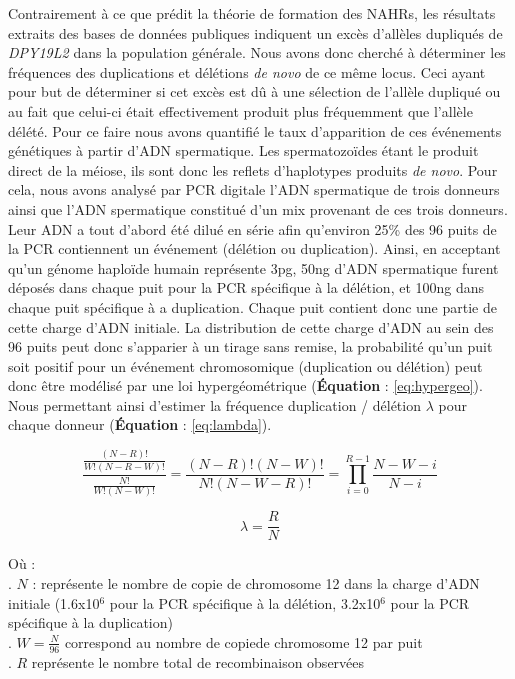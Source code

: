 \documentclass[12pt,a4paper,twoside]{ugathesis}
\theoremstyle{definition}
\theoremstyle{definition}
\theoremstyle{definition}
\theoremstyle{remark}
\begin{document}
Contrairement à ce que prédit la théorie de formation des NAHRs, les
résultats extraits des bases de données publiques indiquent un excès
d'allèles dupliqués de \emph{DPY19L2} dans la population générale. Nous
avons donc cherché à déterminer les fréquences des duplications et
délétions \emph{de novo} de ce même locus. Ceci ayant pour but de
déterminer si cet excès est dû à une sélection de l'allèle dupliqué ou
au fait que celui-ci était effectivement produit plus fréquemment que
l'allèle délété. Pour ce faire nous avons quantifié le taux d'apparition
de ces événements génétiques à partir d'ADN spermatique. Les
spermatozoïdes étant le produit direct de la méiose, ils sont donc les
reflets d'haplotypes produits \emph{de novo}. Pour cela, nous avons
analysé par PCR digitale l'ADN spermatique de trois donneurs ainsi que
l'ADN spermatique constitué d'un mix provenant de ces trois donneurs.
Leur ADN a tout d'abord été dilué en série afin qu'environ 25\% des 96
puits de la PCR contiennent un événement (délétion ou duplication).
Ainsi, en acceptant qu'un génome haploïde humain représente 3pg, 50ng
d'ADN spermatique furent déposés dans chaque puit pour la PCR spécifique
à la délétion, et 100ng dans chaque puit spécifique à a duplication.
Chaque puit contient donc une partie de cette charge d'ADN initiale. La
distribution de cette charge d'ADN au sein des 96 puits peut donc
s'apparier à un tirage sans remise, la probabilité qu'un puit soit
positif pour un événement chromosomique (duplication ou délétion) peut
donc être modélisé par une loi hypergéométrique (\textbf{Équation} :
\eqref{eq:hypergeo}). Nous permettant ainsi d'estimer la fréquence
duplication / délétion \(\lambda\) pour chaque donneur
(\textbf{Équation} : \eqref{eq:lambda}).

\begin{equation} 
\frac{\frac{(N - R)!}{W!(N-R-W)!}}{\frac{N!}{W!(N-W)!}} = \frac{(N-R)!(N-W)!}{N!(N-W-R)!} = \prod_{i=0}^{R-1}{\frac{N-W-i}{N-i}}
\label{eq:hypergeo}
\end{equation}

\begin{equation} 
\lambda = \frac{R}{N}
\label{eq:lambda}
\end{equation}

Où :\\
. \(N\) : représente le nombre de copie de chromosome 12 dans la charge
d'ADN initiale (1.6x10\({^6}\) pour la PCR spécifique à la délétion,
3.2x10\({^6}\) pour la PCR spécifique à la duplication)\\
. \(W = \frac{N}{96}\) correspond au nombre de copiede chromosome 12 par
puit\\
. \(R\) représente le nombre total de recombinaison observées
\end{document}
